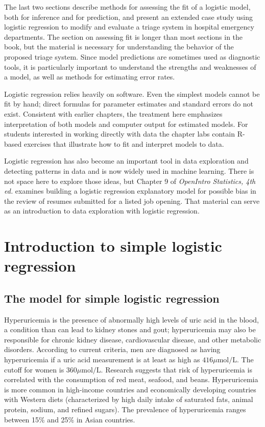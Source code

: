 The last two sections describe methods for assessing the fit of a logistic model, both for inference and for prediction, and present an extended case study using logistic regression to modify and evaluate a triage system in hospital emergency departments.  The section on assessing fit is longer than most sections in the book, but the material is necessary for understanding the behavior of the  proposed triage system. Since model predictions are sometimes used as diagnostic tools, it is particularly important to understand the strengths and weaknesses of a model, as well as methods for estimating error rates.

Logistic regression relies heavily on software.  Even the simplest models cannot be fit by hand; direct formulas for parameter estimates and standard errors do not exist.  Consistent with earlier chapters, the treatment here emphasizes interpretation of both models and computer output for estimated models.  For students interested in working directly with data the chapter labs contain \textsf{R}-based exercises that illustrate how to fit and interpret models to data.

Logistic regression has also become an important tool in data exploration and detecting patterns in data and is now widely used in machine learning.  There is not space here to explore those ideas, but Chapter 9 of \textit{OpenIntro Statistics, 4th ed.} examines building a logistic regression explanatory model for possible bias in the review of resumes submitted for a listed job opening.  That material can serve as an introduction to data exploration with logistic regression.

\section{Introduction to simple logistic regression}
\label{introSimpleLogisticRegression}

\subsection{The model for simple logistic regression}


Hyperuricemia is the presence of abnormally high levels of uric acid in the blood, a  condition than can lead to kidney stones and gout; hyperuricemia may also be responsible for chronic kidney disease, cardiovascular disease, and other metabolic disorders. According to current criteria, men are diagnosed as having hyperuricemia if a uric acid measurement is at least as high as $416\mu\text{mol/L}$.  The cutoff for women is $360\mu\text{mol/L}$. Research suggests that risk of hyperuricemia is correlated with the consumption of red meat, seafood, and beans. Hyperuricemia is more common in high-income countries and economically developing countries with Western diets (characterized by high daily intake of saturated fats, animal protein, sodium, and refined sugars). The prevalence of hyperuricemia ranges between 15\% and 25\% in Asian countries. 

